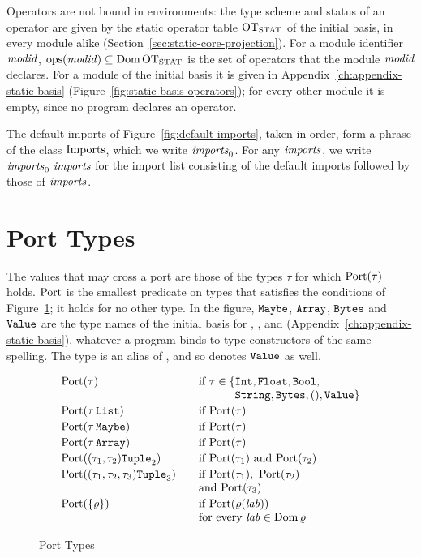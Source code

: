 Operators are not bound in environments: the type scheme and status of an
operator are given by the static operator table $\mathrm{OT}_{\mathrm{STAT}}$ of the initial basis,
in every module alike (Section~\ref{sec:static-core-projection}). For a module
identifier $\mathit{modid}$, $\mathrm{ops}(\mathit{modid}) \subseteq \mathrm{Dom}\,\mathrm{OT}_{\mathrm{STAT}}$ is the set of
operators that the module $\mathit{modid}$ declares. For a module of the initial basis
it is given in Appendix~\ref{ch:appendix-static-basis}
(Figure~\ref{fig:static-basis-operators}); for every other module it is empty,
since no program declares an operator. %

The default imports of Figure~\ref{fig:default-imports}, taken in order, form a
phrase of the class $\mathrm{Imports}$, which we write $\mathit{imports}_0$. For any
$\mathit{imports}$, we write $\mathit{imports}_0\ \mathit{imports}$ for the import list consisting of
the default imports followed by those of $\mathit{imports}$.

\section{Port Types}\label{sec:static-modules-ports}

The values that may cross a port are those of the types $\tau$ for which
$\mathrm{Port}(\tau)$ holds. %
$\mathrm{Port}$ is the smallest predicate on types that satisfies the conditions of
Figure~\ref{fig:static-modules-port}; it holds for no other type. In the
figure, $\mathtt{Maybe}$, $\mathtt{Array}$, $\mathtt{Bytes}$ and $\mathtt{Value}$ are the type names of
the initial basis for , ,  and
(Appendix~\ref{ch:appendix-static-basis}), whatever a program binds to type
constructors of the same spelling. The type  is an alias
of , and so denotes $\mathtt{Value}$ as well.

\begin{figure}[ht]
\centering
\[
\begin{array}{@{}l@{\qquad}l@{}}
  \Port(\tau) & \text{if } \tau \in \{\tInt, \tFloat, \tBool,\\
    & \phantom{\text{if } \tau \in \{} \tString, \tBytes, \tunit, \tValue\}\\[2pt]
  \Port(\tau\,\tList) & \text{if } \Port(\tau)\\[2pt]
  \Port(\tau\,\tMaybe) & \text{if } \Port(\tau)\\[2pt]
  \Port(\tau\,\tArray) & \text{if } \Port(\tau)\\[2pt]
  \Port((\tau_1, \tau_2)\tTuple{2}) & \text{if } \Port(\tau_1) \text{ and } \Port(\tau_2)\\[2pt]
  \Port((\tau_1, \tau_2, \tau_3)\tTuple{3})
    & \text{if } \Port(\tau_1),\ \Port(\tau_2)\\
    & \text{and } \Port(\tau_3)\\[2pt]
  \Port(\rec{\varrho}) & \text{if } \Port(\varrho(\lab))\\
    & \text{for every } \lab \in \Dom\varrho
\end{array}
\]
\caption{Port Types}\label{fig:static-modules-port}
\end{figure}

